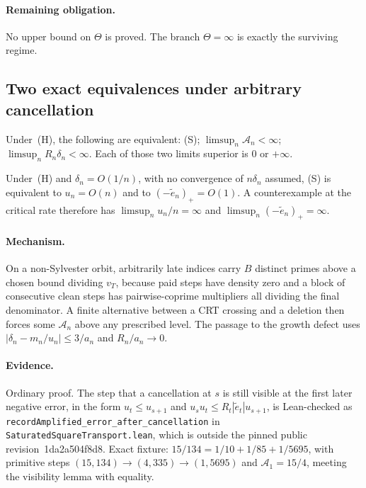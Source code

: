 \documentclass[11pt]{article}
\renewcommand{\commitshort}{1da2a504f8d8}
\begin{document}
\paragraph{Remaining obligation.}
No upper bound on $\Theta$ is proved.  The branch $\Theta=\infty$ is exactly the
surviving regime.

\subsection{Two exact equivalences under arbitrary cancellation}

\begin{theorem}\label{long243:res:recordamplified}
Under~(H), the following are equivalent: (S); $\limsup_n\mathcal A_n<\infty$;
$\limsup_nR_n\delta_n<\infty$.  Each of those two limits superior is $0$ or
$+\infty$.
\end{theorem}

\begin{corollary}\label{long243:res:criticalrate}
Under~(H) and $\delta_n=O(1/n)$, with no convergence of $n\delta_n$ assumed,
(S) is equivalent to $u_n=O(n)$ and to $(-\tilde e_n)_+=O(1)$.  A
counterexample at the critical rate therefore has $\limsup_nu_n/n=\infty$ and
$\limsup_n(-\tilde e_n)_+=\infty$.
\end{corollary}

\paragraph{Mechanism.}
On a non-Sylvester orbit, arbitrarily late indices carry $B$ distinct primes
above a chosen bound dividing $v_T$, because paid steps have density zero and a
block of consecutive clean steps has pairwise-coprime multipliers all dividing
the final denominator.  A finite alternative between a CRT crossing and a
deletion then forces some $\mathcal A_n$ above any prescribed level.  The passage to the
growth defect uses $|\delta_n-m_n/u_n|\le3/a_n$ and $R_n/a_n\to0$.

\paragraph{Evidence.}
Ordinary proof.  The step that a cancellation at $s$ is still visible at the
first later negative error, in the form $u_t\le u_{s+1}$ and
$u_su_t\le R_t|\tilde e_t|u_{s+1}$, is Lean-checked as
\texttt{recordAmplified\_error\_after\_cancellation} in
\texttt{SaturatedSquareTransport.lean}, which is outside the pinned public
revision~\commitshort.  Exact fixture: $15/134=1/10+1/85+1/5695$, with primitive
steps $(15,134)\to(4,335)\to(1,5695)$ and $\mathcal A_1=15/4$, meeting the
visibility lemma with equality.
\end{document}
